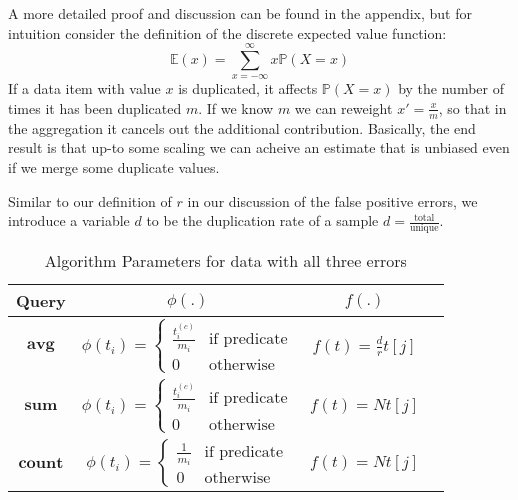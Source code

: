 A more detailed proof and discussion can be found in the appendix, but for intuition consider the definition of the
discrete expected value function:
\[\mathbb{E}(x)=\sum_{x=-\infty}^{\infty}x\mathbb{P}(X=x) \]
If a data item with value $x$ is duplicated, it affects $\mathbb{P}(X=x)$ by the number of times it has been duplicated $m$.
If we know $m$ we can reweight $x'=\frac{x}{m}$, so that in the aggregation it cancels out the additional contribution.
Basically, the end result is that up-to some scaling we can acheive an estimate that is unbiased even if we merge some duplicate values.

Similar to our definition of $r$ in our discussion of the false positive errors, we introduce a variable $d$ to be the duplication rate of a sample $d=\frac{\text{total}}{\text{unique}}$.

\begin{table}[!ht]
\caption{Algorithm Parameters for data with all three errors}
\centering 
\begin{tabular}{c c c c}
\hline\hline
Query & $\phi(.)$ & $f(.)$ \\ 
\hline  %
$\textbf{avg}$ & $\phi(t_i)=\left\{
	\begin{array}{ll}
		\frac{t_i^{(c)}}{m_i}  & \mbox{if } \text{predicate} \\
		0 & \text{otherwise}
	\end{array}
\right.$ & $f(t)=\frac{d}{r}t[j]$ \\ %
$\textbf{sum}$ & $\phi(t_i)=\left\{
	\begin{array}{ll}
		\frac{t_i^{(c)}}{m_i}  & \mbox{if } \text{predicate} \\
		0 & \text{otherwise}
	\end{array}
\right.$ & $f(t)=Nt[j]$ \\
$\textbf{count}$ & $\phi(t_i)=\left\{
	\begin{array}{ll}
		\frac{1}{m_i} & \mbox{if } \text{predicate} \\
		0 & \text{otherwise}
	\end{array}
\right.$ & $f(t)=Nt[j]$ \\ [1ex] %
\hline %
\end{tabular}
\end{table}